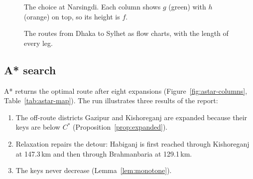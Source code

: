\begin{figure}[htbp]
  \centering
  \begin{minipage}[c]{0.54\textwidth}\centering
    \resizebox{\linewidth}{!}{}
  \end{minipage}\hfill
  \begin{minipage}[c]{0.43\textwidth}\centering
    \label{tab:narsingdi}
    \footnotesize\setlength{\tabcolsep}{4pt}
  \end{minipage}
  \caption{The choice at Narsingdi. Each column shows $g$ (green) with $h$
    (orange) on top, so its height is $f$.}\label{fig:narsingdi}
\end{figure}

\begin{figure}[htbp]
  \centering
  
  \caption{The routes from Dhaka to Sylhet as flow charts, with the length of
    every leg.}\label{fig:route-flow}
\end{figure}

\subsection{A* search}\label{sec:map-astar}

A* returns the optimal route after eight expansions
(Figure~\ref{fig:astar-columns}, Table~\ref{tab:astar-map}). The run
illustrates three results of the report:
\begin{enumerate}[label=(\arabic*)]
  \item The off-route districts Gazipur and Kishoreganj are expanded because
    their keys are below $C^{*}$ (Proposition~\ref{prop:expanded}).
  \item Relaxation repairs the detour: Habiganj is first reached through
    Kishoreganj at 147.3\,km and then through Brahmanbaria at 129.1\,km.
  \item The keys never decrease (Lemma~\ref{lem:monotone}).
\end{enumerate}

